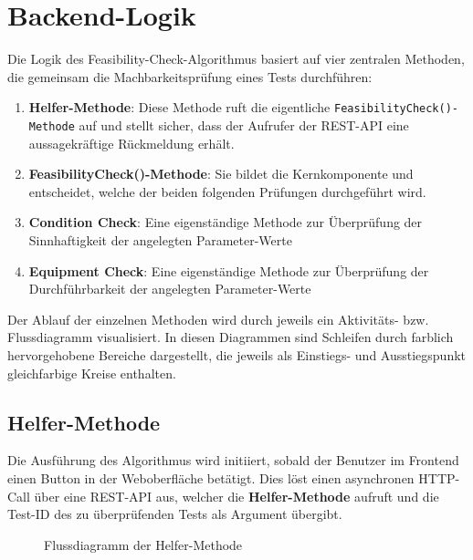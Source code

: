 \section{Backend-Logik}\label{Sec:Backend-Logik}

Die Logik des Feasibility-Check-Algorithmus basiert auf vier zentralen Methoden, die gemeinsam die Machbarkeitsprüfung eines Tests durchführen:  

\begin{enumerate}
    \item \textbf{Helfer-Methode}: Diese Methode ruft die eigentliche \texttt{FeasibilityCheck()-Methode} auf und stellt sicher, dass der Aufrufer der REST-API eine aussagekräftige Rückmeldung erhält.  
    \item \textbf{FeasibilityCheck()-Methode}: Sie bildet die Kernkomponente und entscheidet, welche der beiden folgenden Prüfungen durchgeführt wird.  
    \item \textbf{Condition Check}: Eine eigenständige Methode zur Überprüfung der Sinnhaftigkeit der angelegten Parameter-Werte
    \item \textbf{Equipment Check}: Eine eigenständige Methode zur Überprüfung der Durchführbarkeit der angelegten Parameter-Werte
\end{enumerate}  

Der Ablauf der einzelnen Methoden wird durch jeweils ein Aktivitäts- bzw. Flussdiagramm visualisiert. In diesen Diagrammen sind Schleifen durch farblich hervorgehobene Bereiche dargestellt, die jeweils als Einstiegs- und Ausstiegspunkt gleichfarbige Kreise enthalten.


\subsection{Helfer-Methode}

Die Ausführung des Algorithmus wird initiiert, sobald der Benutzer im Frontend einen Button in der Weboberfläche betätigt. Dies löst einen asynchronen HTTP-Call über eine REST-API aus, welcher die \textbf{Helfer-Methode} aufruft und die Test-ID des zu überprüfenden Tests als Argument übergibt.

\begin{figure}[!htbp]
    \centering
    \caption{Flussdiagramm der Helfer-Methode}
    \label{fig:feasibility-http-call-method}
\end{figure}

